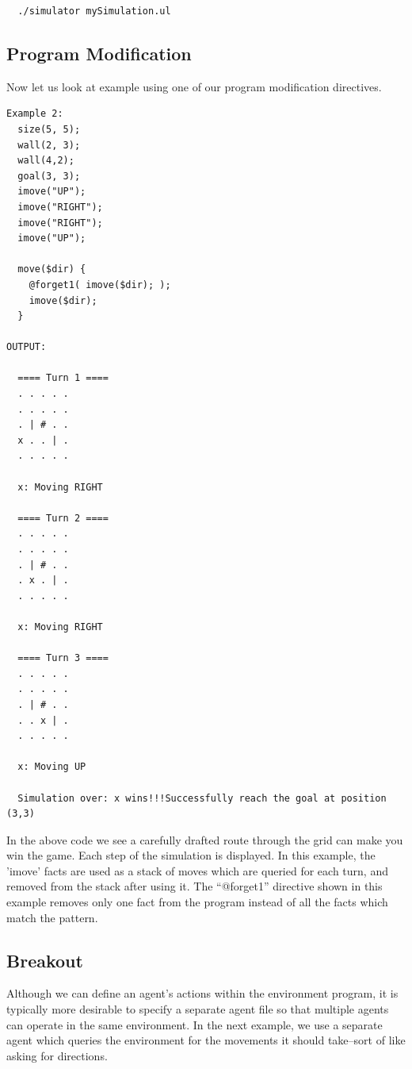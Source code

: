 \documentclass[onecolumn,titlepage]{article}
\begin{document}
\begin{verbatim}
  ./simulator mySimulation.ul
\end{verbatim}

\subsection{Program Modification}

Now let us look at example using one of our program modification
directives.

\begin{verbatim}
Example 2:
  size(5, 5);
  wall(2, 3);
  wall(4,2);
  goal(3, 3);
  imove("UP");
  imove("RIGHT");
  imove("RIGHT");
  imove("UP");

  move($dir) {
    @forget1( imove($dir); );
    imove($dir);        
  }

OUTPUT:

  ==== Turn 1 ====
  . . . . .
  . . . . .
  . | # . .
  x . . | .
  . . . . .

  x: Moving RIGHT

  ==== Turn 2 ====
  . . . . .
  . . . . .
  . | # . .
  . x . | .
  . . . . .

  x: Moving RIGHT

  ==== Turn 3 ====
  . . . . .
  . . . . .
  . | # . .
  . . x | .
  . . . . .

  x: Moving UP

  Simulation over: x wins!!!Successfully reach the goal at position (3,3)
\end{verbatim}

In the above code we see a carefully drafted route through the
grid can make you win the game. Each step of the simulation is
displayed. In this example, the 'imove' facts are used as a stack of
moves which are queried for each turn, and removed from the stack
after using it.  The ``@forget1'' directive shown in this example
removes only one fact from the program instead of all the facts which
match the pattern.

\subsection{Breakout}

Although we can define an agent's actions within the environment
program, it is typically more desirable to specify a separate agent
file so that multiple agents can operate in the same environment.  In
the next example, we use a separate agent which queries the
environment for the movements it should take--sort of like asking for
directions.
\end{document}
